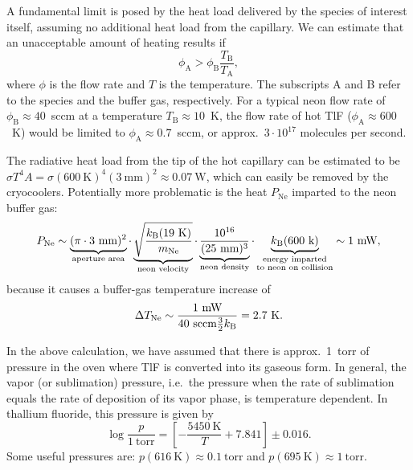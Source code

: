 A fundamental limit is posed by the heat load delivered by the species of
interest itself, assuming no additional heat load from the capillary. We can
estimate that an unacceptable amount of heating results if
\cite[eqn~4.2]{patterson2010thesis}
%
\[
   {\phi_\text{A}}>{\phi_\text{B}}\frac{T_\text{B}}{T_\text{A}},
\]
%
where $\phi$ is the flow rate and $T$ is the temperature. The subscripts A and B
refer to the species and the buffer gas, respectively. For a typical neon flow
rate of $\phi_\text{B}\approx40$~sccm at a temperature $T_\text{B}\approx10$~K,
the flow rate of hot TlF ($\phi_\text{A}\approx600$~K) would be limited to
$\phi_\text{A}\approx0.7$~sccm, or approx.\ $3\cdot10^{17}$ molecules per
second.

The radiative heat load from the tip of the hot capillary can be estimated to be
$\sigma T^4A=\sigma(600~\text{K})^4(3~\text{mm})^2\approx0.07~\text{W}$, which
can easily be removed by the cryocoolers. Potentially more problematic is the
heat $P_\text{Ne}$ imparted to the neon buffer gas:
%
\[
   P_\text{Ne}\sim
   \underbrace{(\pi\cdot3~\text{mm})^2}_\text{aperture area}
   \cdot
   \underbrace{\sqrt{\frac{k_\text{B}(19~\text{K})}{m_\text{Ne}}}}_\text{neon velocity}
   \cdot
   \underbrace{\frac{10^{16}}{(25~\text{mm})^3}}_\text{neon density}
   \cdot
   \underbrace{k_\text{B}(600~\text{k})}_{\substack{\text{energy imparted}\\\text{to neon on
   collision}}}
   \sim1~\text{mW},
\]
%
because it causes a buffer-gas temperature increase of
%
\[
   \Delta
   T_\text{Ne}\sim\frac{1~\text{mW}}{40~\text{sccm}\frac32k_\text{B}}=2.7~\text{K}.
\]

In the above calculation, we have assumed that there is approx.\ 1~torr of
pressure in the oven where TlF is converted into its gaseous form. In general,
the vapor (or sublimation) pressure, i.e.\ the pressure when the rate of
sublimation equals the rate of deposition of its vapor phase, is temperature
dependent. In thallium fluoride, this pressure is given by
\cite{keneshea1965thermodynamics}
%
\[
   \log\frac{p}{1~\text{torr}}=\left[-\frac{5450~\text{K}}{T}+7.841\right]\pm0.016.
\]
%
Some useful pressures are: $p(616~\text{K})\approx0.1~\text{torr}$ and
$p(695~\text{K})\approx1~\text{torr}$.

